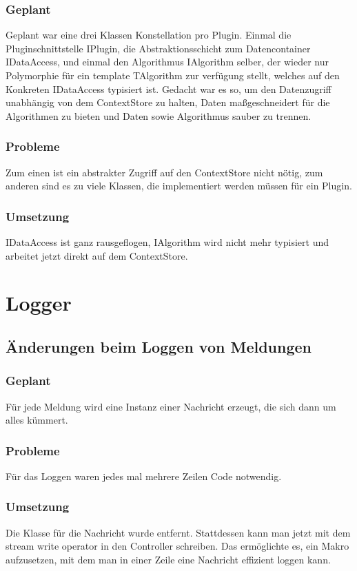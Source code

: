 \subsubsection{Geplant}
Geplant war eine drei Klassen Konstellation pro Plugin. Einmal die Pluginschnittstelle IPlugin, die Abstraktionsschicht zum Datencontainer IDataAccess, und einmal den Algorithmus IAlgorithm selber, der wieder nur Polymorphie für ein template TAlgorithm zur verfügung stellt, welches auf den Konkreten IDataAccess typisiert ist. Gedacht war es so, um den Datenzugriff unabhängig von dem ContextStore zu halten, Daten maßgeschneidert für die Algorithmen zu bieten und Daten sowie Algorithmus sauber zu trennen.
\subsubsection{Probleme}
Zum einen ist ein abstrakter Zugriff auf den ContextStore nicht nötig, zum anderen sind es zu viele Klassen, die implementiert werden müssen für ein Plugin.
\subsubsection{Umsetzung}
IDataAccess ist ganz rausgeflogen, IAlgorithm wird nicht mehr typisiert und arbeitet jetzt direkt auf dem ContextStore.
\section{Logger}
\subsection{Änderungen beim Loggen von Meldungen}
\subsubsection{Geplant}
Für jede Meldung wird eine Instanz einer Nachricht erzeugt, die sich dann um alles kümmert.
\subsubsection{Probleme}
Für das Loggen waren jedes mal mehrere Zeilen Code notwendig.
\subsubsection{Umsetzung}
Die Klasse für die Nachricht wurde entfernt. Stattdessen kann man jetzt mit dem stream write operator in den Controller schreiben. Das ermöglichte es, ein Makro aufzusetzen, mit dem man in einer Zeile eine Nachricht effizient loggen kann.
